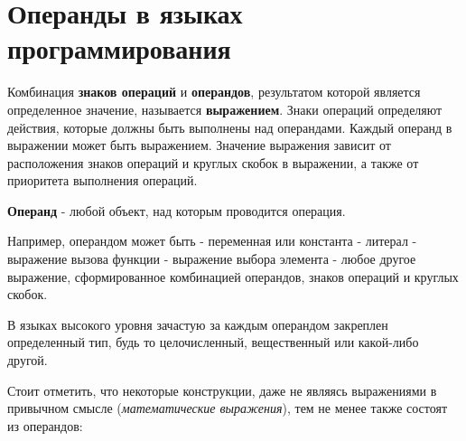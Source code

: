 \section{Операнды в языках
программирования}\label{ux43eux43fux435ux440ux430ux43dux434ux44b-ux432-ux44fux437ux44bux43aux430ux445-ux43fux440ux43eux433ux440ux430ux43cux43cux438ux440ux43eux432ux430ux43dux438ux44f}

Комбинация \textbf{знаков операций} и \textbf{операндов}, результатом
которой является определенное значение, называется \textbf{выражением}.
Знаки операций определяют действия, которые должны быть выполнены над
операндами. Каждый операнд в выражении может быть выражением. Значение
выражения зависит от расположения знаков операций и круглых скобок в
выражении, а также от приоритета выполнения операций.

\textbf{Операнд} - любой объект, над которым проводится операция.

Например, операндом может быть - переменная или константа - литерал -
выражение вызова функции - выражение выбора элемента - любое другое
выражение, сформированное комбинацией операндов, знаков операций и
круглых скобок.

В языках высокого уровня зачастую за каждым операндом закреплен
определенный тип, будь то целочисленный, вещественный или какой-либо
другой.

Стоит отметить, что некоторые конструкции, даже не являясь выражениями в
привычном смысле (\emph{математические выражения}), тем не менее также
состоят из операндов:

